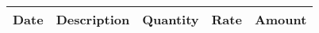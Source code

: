 \documentclass[12pt]{article}
\begin{document}

\vspace{0.2in}
\begin{center}
\renewcommand{\arraystretch}{1.2}
\begin{tabularx}{\textwidth}{|c|X|r|r|r|}
\hline
\cellcolor[gray]{0.9} Date &
\cellcolor[gray]{0.9} Description &
\cellcolor[gray]{0.9} Quantity &
\cellcolor[gray]{0.9} Rate &
\cellcolor[gray]{0.9} Amount \\ \hline



\end{tabularx}
\label{tab:detail}
\end{center}
\end{document}

